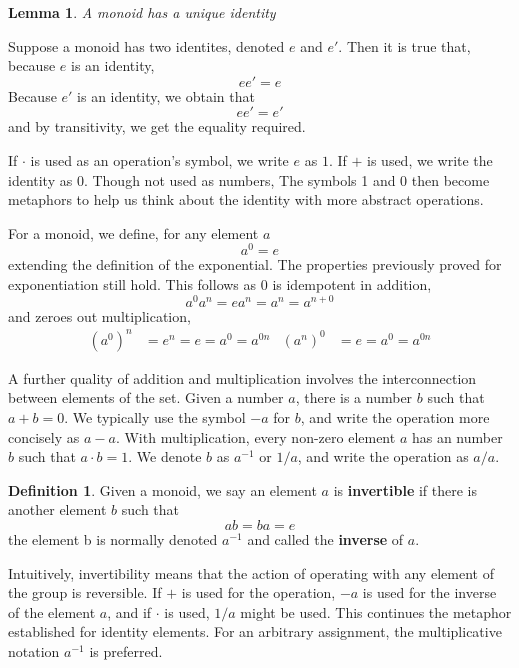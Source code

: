 \documentclass[12pt]{amsbook}
\makeatletter
\theoremstyle{plain}
\newtheorem{lemma}[theorem]{Lemma}
\theoremstyle{definition}
\newtheorem{definition}{Definition}
\renewenvironment{proof}[1][\proofname]{\par
  \pushQED{\qed}%
  \normalfont \topsep6\p@\@plus6\p@\relax
  \list{}{\leftmargin=0em
          \rightmargin=\leftmargin
          \settowidth{\itemindent}{\itshape#1}%
          \labelwidth=\itemindent}

  \item[\hskip\labelsep
        \itshape
    #1\@addpunct{.}]\ignorespaces
}{%
  \popQED\endlist\@endpefalse
}
\makeatother
\begin{document}
\begin{lemma} A monoid has a unique identity \end{lemma}
\begin{proof}
    Suppose a monoid has two identites, denoted $e$ and $e'$. Then it is true that, because $e$ is an identity,
    \[ ee' = e \]
    Because $e'$ is an identity, we obtain that
    \[ ee' = e' \]
    and by transitivity, we get the equality required.
\end{proof}

If $\cdotp$ is used as an operation's symbol, we write $e$ as $1$. If $+$ is used, we write the identity as $0$. Though not used as numbers, The symbols 1 and 0 then become metaphors to help us think about the identity with more abstract operations.

For a monoid, we define, for any element $a$
%
\[ a^0 = e \]
%
extending the definition of the exponential. The properties previously proved for exponentiation still hold. This follows as $0$ is idempotent in addition,
%
\[a^0 a^n = e a^n = a^n = a^{n+0}\]
%
and zeroes out multiplication,
%
\begin{align*} (a^0)^n &= e^n = e = a^0 = a^{0n} & (a^n)^0 &= e = a^0 = a^{0n} \end{align*}

A further quality of addition and multiplication involves the interconnection between elements of the set. Given a number $a$, there is a number $b$ such that $a + b = 0$. We typically use the symbol $-a$ for $b$, and write the operation more concisely as $a - a$. With multiplication, every non-zero element $a$ has an number $b$ such that $a \cdotp b = 1$. We denote $b$ as $a^{-1}$ or $1/a$, and write the operation as $a/a$.

\begin{definition}
    Given a monoid, we say an element $a$ is {\bf invertible} if there is another element $b$ such that
    \[ ab = ba = e \]
    the element b is normally denoted $a^{-1}$ and called the {\bf inverse} of $a$.
\end{definition}

Intuitively, invertibility means that the action of operating with any element of the group is reversible. If $+$ is used for the operation, $-a$ is used for the inverse of the element $a$, and if $\cdotp$ is used, $1/a$ might be used. This continues the metaphor established for identity elements. For an arbitrary assignment, the multiplicative notation  $a^{-1}$ is preferred.
\end{document}
